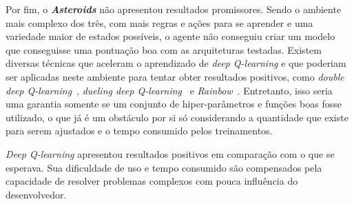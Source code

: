 Por fim, o \textbf{\textit{Asteroids}} não apresentou resultados promissores.
Sendo o ambiente mais complexo dos três, com mais regras e ações para se aprender e uma variedade maior de estados possíveis, o agente não conseguiu criar um modelo que conseguisse uma pontuação boa com as arquiteturas testadas.
Existem diversas técnicas que aceleram o aprendizado de \textit{deep Q-learning} e que poderiam ser aplicadas neste ambiente para tentar obter resultados positivos, como \textit{double deep Q-learning}~\cite{DBLP:journals/corr/HasseltGS15}, \textit{dueling deep Q-learning}~\cite{DBLP:journals/corr/WangFL15} e \textit{Rainbow}~\cite{DBLP:journals/corr/abs-1710-02298}.
Entretanto, isso seria uma garantia somente se um conjunto de hiper-parâmetros e funções boas fosse utilizado, o que já é um obstáculo por si só considerando a quantidade que existe para serem ajustados e o tempo consumido pelos treinamentos.

\textit{Deep Q-learning} apresentou resultados positivos em comparação com o que se esperava.
Sua dificuldade de uso e tempo consumido são compensados pela capacidade de resolver problemas complexos com pouca influência do desenvolvedor.


%






